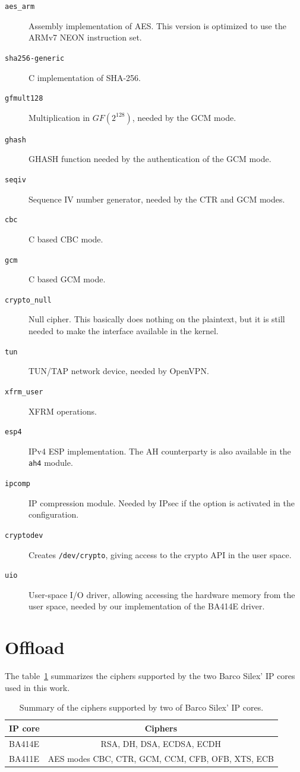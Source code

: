 \begin{description}
	\item[\texttt{aes\_arm}] Assembly implementation of AES. This version is optimized to use the ARMv7 NEON instruction set.
	\item[\texttt{sha256-generic}] C implementation of SHA-256.
	\item[\texttt{gfmult128}] Multiplication in $GF(2^{128})$, needed by the GCM mode.
	\item[\texttt{ghash}] GHASH function needed by the authentication of the GCM mode.
	\item[\texttt{seqiv}] Sequence IV number generator, needed by the CTR and GCM modes.
	\item[\texttt{cbc}] C based CBC mode.
	\item[\texttt{gcm}] C based GCM mode.
	\item[\texttt{crypto\_null}] Null cipher. This basically does nothing on the plaintext, but it is still needed to make the interface available in the kernel.
	\item[\texttt{tun}] TUN/TAP network device, needed by OpenVPN.
	\item[\texttt{xfrm\_user}] XFRM operations.
	\item[\texttt{esp4}] IPv4 ESP implementation. The AH counterparty is also available in the \texttt{ah4} module.
	\item[\texttt{ipcomp}] IP compression module. Needed by IPsec if the option is activated in the configuration.
	\item[\texttt{cryptodev}] Creates \texttt{/dev/crypto}, giving access to the crypto API in the user space.
	\item[\texttt{uio}] User-space I/O driver, allowing accessing the hardware memory from the user space, needed by our implementation of the BA414E driver.
\end{description}

\section{Offload}

The table~\ref{tab:ip-ciphers} summarizes the ciphers supported by the two Barco Silex' IP cores used in this work.

\begin{table}[ht]
\center
\begin{tabular}{|l|c|}\hline
IP core & Ciphers \\ \hline
BA414E & RSA, DH, DSA, ECDSA, ECDH \\ 
BA411E & AES modes CBC, CTR, GCM, CCM, CFB, OFB, XTS, ECB \\ \hline
\end{tabular}
\caption{Summary of the ciphers supported by two of Barco Silex' IP cores.}{}
\label{tab:ip-ciphers}
\end{table}


